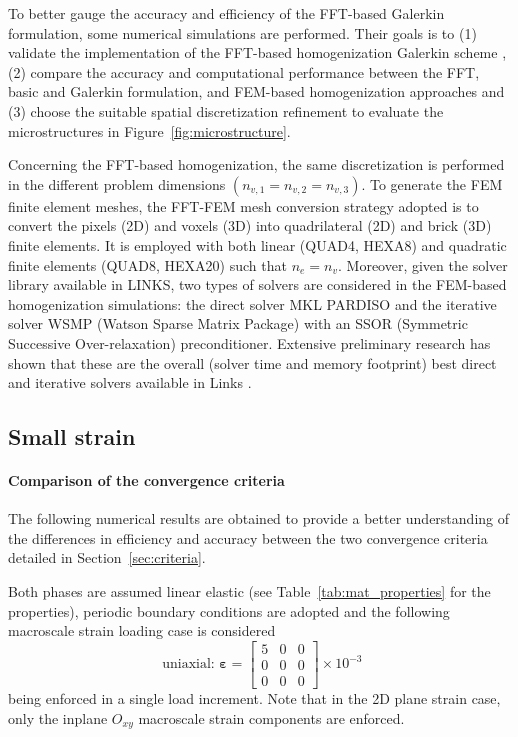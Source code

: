 To better gauge the accuracy and efficiency of the FFT-based Galerkin formulation, some numerical simulations are performed.
Their goals is to (1) validate the implementation of the FFT-based homogenization Galerkin scheme \citep{vondrejc_fft-based_2014, zeman_finite_2017, de_geus_finite_2017}, (2) compare the accuracy and computational performance between the FFT, basic \citep{moulinec_fast_1994} and Galerkin formulation, and FEM-based homogenization approaches and (3) choose the suitable spatial discretization refinement to evaluate the microstructures in Figure~\ref{fig:microstructure}.

Concerning the FFT-based homogenization, the same discretization is performed in the different problem dimensions \(\left(n_{v, 1}=n_{v, 2}=n_{v, 3}\right)\).
To generate the FEM finite element meshes, the FFT-FEM mesh conversion strategy adopted is to convert the pixels (2D) and voxels (3D) into quadrilateral (2D) and brick (3D) finite elements.
It is employed with both linear (QUAD4, HEXA8) and quadratic finite elements (QUAD8, HEXA20) such that \(n_{e}=n_{v}\).
Moreover, given the solver library available in LINKS, two types of solvers are considered in the FEM-based homogenization simulations: the direct solver MKL PARDISO \citep{schenk2001pardiso, schenk2004solving} and the iterative solver WSMP (Watson Sparse Matrix Package) \citep{gupta_improved_2002, gupta_wsmp_2002} with an SSOR (Symmetric Successive Over-relaxation) preconditioner.
Extensive preliminary research has shown that these are the overall (solver time and memory footprint) best direct and iterative solvers available in Links \citep{cardoso_coelho_election_2019}.

\subsection{Small strain}

\paragraph{Comparison of the convergence criteria}
The following numerical results are obtained to provide a better understanding of the differences in efficiency and accuracy between the two convergence criteria detailed in Section~\ref{sec:criteria}.

Both phases are assumed linear elastic (see Table~\ref{tab:mat_properties} for the properties), periodic boundary conditions are adopted and the following macroscale strain loading case is considered
\begin{equation}
\text { uniaxial: } \bm{\varepsilon}=\left[\begin{array}{lll}
5 & 0 & 0 \\
0 & 0 & 0 \\
0 & 0 & 0
\end{array}\right] \times 10^{-3}
\end{equation}
being enforced in a single load increment.
Note that in the 2D plane strain case, only the inplane \(O_{x y}\) macroscale strain components are enforced.

